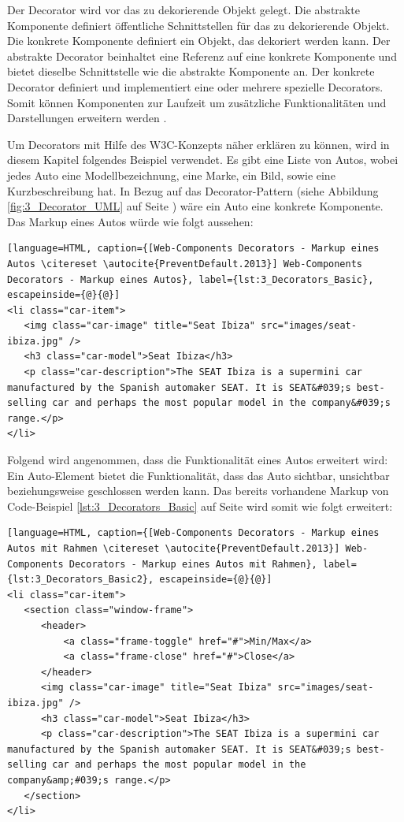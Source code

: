 Der Decorator wird vor das zu dekorierende Objekt gelegt. Die abstrakte Komponente definiert öffentliche Schnittstellen für das zu dekorierende Objekt. Die konkrete Komponente definiert ein Objekt, das dekoriert werden kann. Der abstrakte Decorator beinhaltet eine Referenz auf eine konkrete Komponente und bietet dieselbe Schnittstelle wie die abstrakte Komponente an. Der konkrete Decorator definiert und implementiert eine oder mehrere spezielle Decorators.
Somit können Komponenten zur Laufzeit um zusätzliche Funktionalitäten und Darstellungen erweitern werden \citereset \autocite[siehe][S. 196-200]{Gamma.1995}.

Um Decorators mit Hilfe des W3C-Konzepts näher erklären zu können, wird in diesem Kapitel folgendes Beispiel verwendet. Es gibt eine Liste von Autos, wobei jedes Auto eine Modellbezeichnung, eine Marke, ein Bild, sowie eine Kurzbeschreibung hat. In Bezug auf das Decorator-Pattern (siehe Abbildung \ref{fig:3_Decorator_UML} auf Seite \pageref{fig:3_Decorator_UML}) wäre ein Auto eine konkrete Komponente. Das Markup eines Autos würde wie folgt aussehen:

\begin{lstlisting}[language=HTML, caption={[Web-Components Decorators - Markup eines Autos \citereset \autocite{PreventDefault.2013}] Web-Components Decorators - Markup eines Autos}, label={lst:3_Decorators_Basic}, escapeinside={@}{@}]
<li class="car-item">
   <img class="car-image" title="Seat Ibiza" src="images/seat-ibiza.jpg" />
   <h3 class="car-model">Seat Ibiza</h3>
   <p class="car-description">The SEAT Ibiza is a supermini car manufactured by the Spanish automaker SEAT. It is SEAT&#039;s best-selling car and perhaps the most popular model in the company&#039;s range.</p>
</li>
\end{lstlisting}

Folgend wird angenommen, dass die Funktionalität eines Autos erweitert wird: Ein Auto-Element bietet die Funktionalität, dass das Auto sichtbar, unsichtbar beziehungsweise geschlossen werden kann. Das bereits vorhandene Markup von Code-Beispiel \ref{lst:3_Decorators_Basic} auf Seite \pageref{lst:3_Decorators_Basic} wird somit wie folgt erweitert:

\begin{lstlisting}[language=HTML, caption={[Web-Components Decorators - Markup eines Autos mit Rahmen \citereset \autocite{PreventDefault.2013}] Web-Components Decorators - Markup eines Autos mit Rahmen}, label={lst:3_Decorators_Basic2}, escapeinside={@}{@}]
<li class="car-item">
   <section class="window-frame">
      <header>
          <a class="frame-toggle" href="#">Min/Max</a>
          <a class="frame-close" href="#">Close</a>
      </header>
      <img class="car-image" title="Seat Ibiza" src="images/seat-ibiza.jpg" />
      <h3 class="car-model">Seat Ibiza</h3>
      <p class="car-description">The SEAT Ibiza is a supermini car manufactured by the Spanish automaker SEAT. It is SEAT&#039;s best-selling car and perhaps the most popular model in the company&amp;#039;s range.</p>
   </section>
</li>
\end{lstlisting}

